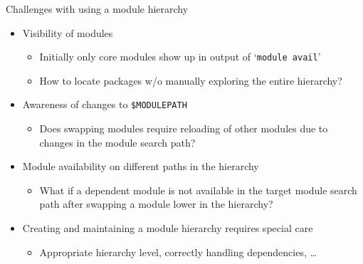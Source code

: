 \documentclass[10pt,xcolor={usenames,dvipsnames}]{beamer}
\begin{document}
\begin{frame}{Challenges with using a module hierarchy}
\begin{itemize}
    \item
        Visibility of modules
        \begin{itemize}
            \item
                Initially only core modules show up in output of `\texttt{module avail}'
            \item
                How to locate packages w/o manually exploring the entire
                hierarchy?
        \end{itemize}
    \smallskip
    \item
        Awareness of changes to \texttt{\$MODULEPATH}
        \begin{itemize}
            \item
                Does swapping modules require reloading of other modules due
                to changes in the module search path?
        \end{itemize}
    \smallskip
    \item
        Module availability on different paths in the hierarchy
        \begin{itemize}
            \item
                What if a dependent module is not available in the target
                module search path after swapping a module lower in the
                hierarchy?
        \end{itemize}
    \smallskip
    \item
        Creating and maintaining a module hierarchy requires special care
        \begin{itemize}
            \item
                Appropriate hierarchy level, correctly handling dependencies, \ldots
        \end{itemize}
\end{itemize}
\end{frame}

\end{document}
